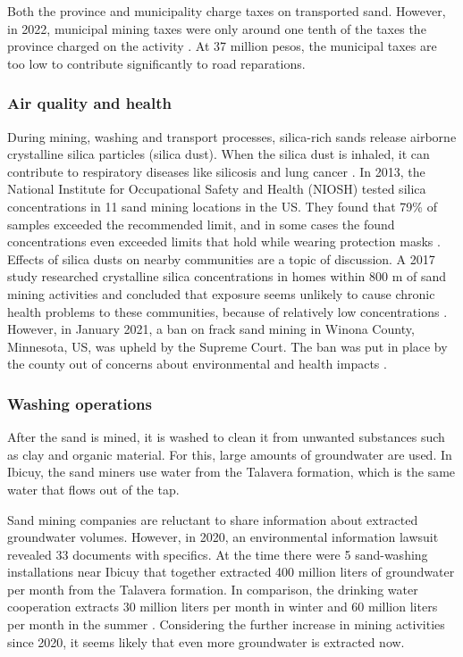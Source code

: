 Both the province and municipality charge taxes on transported sand. However, in 2022, municipal mining taxes were only around one tenth of the taxes the province charged on the activity \autocite{novasImpactoAmbientalOculto2022}. At 37 million pesos, the municipal taxes are too low to contribute significantly to road reparations.

\subsubsection{Air quality and health}
During mining, washing and transport processes, silica-rich sands release airborne crystalline silica particles (silica dust). When the silica dust is inhaled, it can contribute to respiratory diseases like silicosis and lung cancer \autocite{physiciansforsocialresponsibilityCompendiumScientificMedical2023}. In 2013, the National Institute for Occupational Safety and Health (NIOSH) tested silica concentrations in 11 sand mining locations in the US. They found that 79\% of samples exceeded the recommended limit, and in some cases the found concentrations even exceeded limits that hold while wearing protection masks \autocite{fogliaSedArena2023}. Effects of silica dusts on nearby communities are a topic of discussion. A 2017 study researched crystalline silica concentrations in homes within 800 m of sand mining activities and concluded that exposure seems unlikely to cause chronic health problems to these communities, because of relatively low concentrations \autocite{petersCommunityAirborneParticulate2017}. However, in January 2021, a ban on frack sand mining in Winona County, Minnesota, US, was upheld by the Supreme Court. The ban was put in place by the county out of concerns about environmental and health impacts \autocite{physiciansforsocialresponsibilityCompendiumScientificMedical2023}.

\subsubsection{Washing operations}
After the sand is mined, it is washed to clean it from unwanted substances such as clay and organic material. For this, large amounts of groundwater are used. In Ibicuy, the sand miners use water from the Talavera formation, which is the same water that flows out of the tap. 

Sand mining companies are reluctant to share information about extracted groundwater volumes. However, in 2020, an environmental information lawsuit revealed 33 documents with specifics. At the time there were 5 sand-washing installations near Ibicuy that together extracted 400 million liters of groundwater per month from the Talavera formation. In comparison, the drinking water cooperation extracts 30 million liters per month in winter and 60 million liters per month in the summer \autocite{fogliaSedArena2023}. Considering the further increase in mining activities since 2020, it seems likely that even more groundwater is extracted now. 

